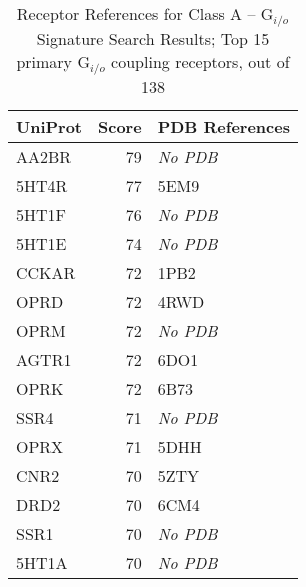 \begin{table}[!h]

\caption{\label{tab:a-gio-references}Receptor References for Class A – G$_{i/o}$ Signature Search Results; Top 15 primary G$_{i/o}$ coupling receptors, out of 138}
\centering
\begin{tabular}{lrl}
\toprule
UniProt & Score & PDB References\\
\midrule
AA2BR & 79 & \textit{No PDB}\\
5HT4R & 77 & 5EM9\\
5HT1F & 76 & \textit{No PDB}\\
5HT1E & 74 & \textit{No PDB}\\
CCKAR & 72 & 1PB2\\
OPRD & 72 & 4RWD\\
OPRM & 72 & \textit{No PDB}\\
AGTR1 & 72 & 6DO1\\
OPRK & 72 & 6B73\\
SSR4 & 71 & \textit{No PDB}\\
OPRX & 71 & 5DHH\\
CNR2 & 70 & 5ZTY\\
DRD2 & 70 & 6CM4\\
SSR1 & 70 & \textit{No PDB}\\
5HT1A & 70 & \textit{No PDB}\\
\bottomrule
\end{tabular}
\end{table}
